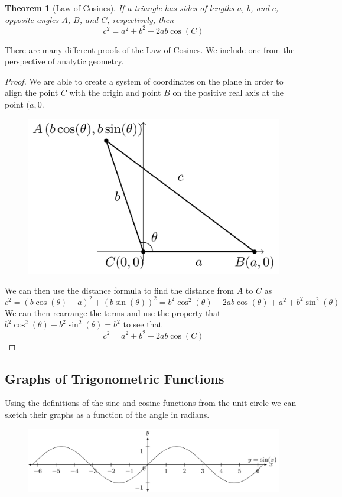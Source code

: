 \documentclass[
]{book}
\newtheorem{theorem}{Theorem}[chapter]
\theoremstyle{definition}
\theoremstyle{definition}
\theoremstyle{definition}
\theoremstyle{definition}
\theoremstyle{remark}
\begin{document}
\begin{theorem}[Law of Cosines]
If a triangle has sides of lengths \(a\), \(b\), and \(c\), opposite angles \(A\), \(B\), and \(C\), respectively, then
\[c^2=a^2+b^2 -2ab\cos(C)\]
\end{theorem}

There are many different proofs of the Law of Cosines. We include one from the perspective of analytic geometry.

\begin{proof}
We are able to create a system of coordinates on the plane in order to align the point \(C\) with the origin and point \(B\) on the positive real axis at the point \((a,0\).

\begin{figure}

{\centering \includegraphics[width=0.4\linewidth]{tikz/law-of-cosines} 

}

\end{figure}

We can then use the distance formula to find the distance from \(A\) to \(C\) as
\[c^2=\left(b\cos(\theta)-a\right)^2 + (b\sin(\theta))^2= b^2 \cos^2(\theta)-2ab\cos(\theta) + a^2 + b^2 \sin^2(\theta)\]
We can then rearrange the terms and use the property that \(b^2\cos^2(\theta) + b^2\sin^2(\theta) = b^2\) to see that
\[c^2=a^2+b^2 -2ab\cos(C)\]
\end{proof}

\hypertarget{graphs-of-trigonometric-functions}{%
\subsection{Graphs of Trigonometric Functions}\label{graphs-of-trigonometric-functions}}

Using the definitions of the sine and cosine functions from the unit circle we can sketch their graphs as a function of the angle in radians.

\begin{figure}

{\centering \includegraphics[width=1\linewidth]{tikz/sine-graph} 

}

\end{figure}
\end{document}
